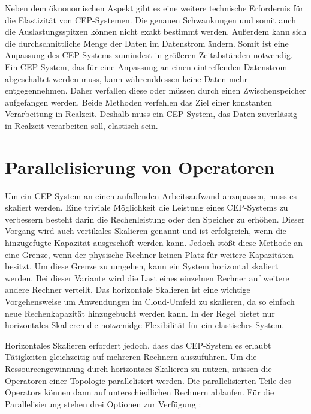 Neben dem öknonomischen Aspekt gibt es eine weitere technische Erfordernis für die Elastizität von CEP-Systemen.
Die genauen Schwankungen und somit auch die Auslastungsspitzen können nicht exakt bestimmt werden.
Außerdem kann sich die durchschnittliche Menge der Daten im Datenstrom ändern.
Somit ist eine Anpassung des CEP-Systems zumindest in größeren Zeitabständen notwendig.
Ein CEP-System, das für eine Anpassung an einen eintreffenden Datenstrom abgeschaltet werden muss, kann währenddessen keine Daten mehr entgegennehmen.
Daher verfallen diese oder müssen durch einen Zwischenspeicher aufgefangen werden.
Beide Methoden verfehlen das Ziel einer konstanten Verarbeitung in Realzeit.
Deshalb muss ein CEP-System, das Daten zuverlässig in Realzeit verarbeiten soll, elastisch sein.

\section{Parallelisierung von Operatoren}

Um ein CEP-System an einen anfallenden Arbeitsaufwand anzupassen, muss es skaliert werden.
Eine triviale Möglichkeit die Leistung eines CEP-Systems zu verbessern besteht darin die Rechenleistung oder den Speicher zu erhöhen.
Dieser Vorgang wird auch vertikales Skalieren genannt und ist erfolgreich, wenn die hinzugefügte Kapazität ausgeschöft werden kann.
Jedoch stößt diese Methode an eine Grenze, wenn der physische Rechner keinen Platz für weitere Kapazitäten besitzt.
Um diese Grenze zu umgehen, kann ein System horizontal skaliert werden.
Bei dieser Variante wird die Last eines einzelnen Rechner auf weitere andere Rechner verteilt.
Das horizontale Skalieren ist eine wichtige Vorgehensweise um Anwendungen im Cloud-Umfeld zu skalieren, da so einfach neue Rechenkapazität hinzugebucht werden kann.
In der Regel bietet nur horizontales Skalieren die notwenidge Flexibilität für ein elastisches System.

Horizontales Skalieren erfordert jedoch, dass das CEP-System es erlaubt Tätigkeiten gleichzeitig auf mehreren Rechnern auszuführen.
Um die Ressourcengewinnung durch horizontaes Skalieren zu nutzen, müssen die Operatoren einer Topologie parallelisiert werden.
Die parallelisierten Teile des Operators können dann auf unterschiedlichen Rechnern ablaufen.
Für die Parallelisierung stehen drei Optionen zur Verfügung \cite{de_assuncao_distributed_2017}:

